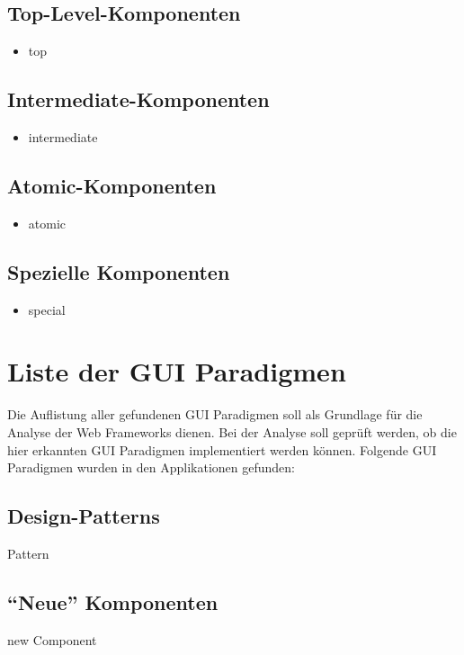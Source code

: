   \subsection{Top-Level-Komponenten}
  
  \begin{itemize}
    \item top
  \end{itemize}
  
  \subsection{Intermediate-Komponenten}
  
  \begin{itemize}
    \item intermediate
  \end{itemize}
  
  \subsection{Atomic-Komponenten}
  
  \begin{itemize}
    \item atomic
  \end{itemize}
  
  \subsection{Spezielle Komponenten}
  
  \begin{itemize}
    \item special
  \end{itemize}
  
  \section{Liste der GUI Paradigmen}
  
  Die Auflistung aller gefundenen GUI Paradigmen soll als Grundlage für die
  Analyse der Web Frameworks dienen. Bei der Analyse soll geprüft werden, ob
  die hier erkannten GUI Paradigmen implementiert werden können. Folgende GUI
  Paradigmen wurden in den Applikationen gefunden:
      
  \subsection{Design-Patterns}
  
  \begin{description}
    \item[Pattern]
  \end{description}
  
  \subsection{``Neue'' Komponenten}
  
  \begin{description}
    \item[new Component]
  \end{description}